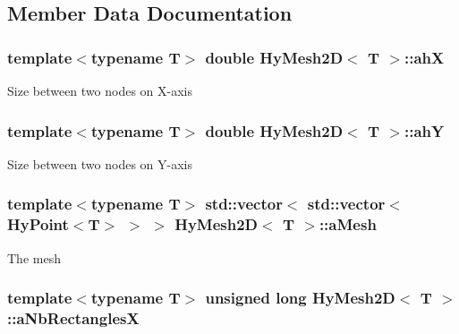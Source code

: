 \subsection{Member Data Documentation}
\hypertarget{classHyMesh2D_a613e4597dc45ca5629ec46eb941e9db8}{
\subsubsection[{ahX}]{\setlength{\rightskip}{0pt plus 5cm}template$<$typename T$>$ double {\bf HyMesh2D}$<$ T $>$::{\bf ahX}}}
\label{classHyMesh2D_a613e4597dc45ca5629ec46eb941e9db8}
Size between two nodes on X-\/axis \hypertarget{classHyMesh2D_a90e7b6ebe92fca8ad22795899ec8500b}{
\subsubsection[{ahY}]{\setlength{\rightskip}{0pt plus 5cm}template$<$typename T$>$ double {\bf HyMesh2D}$<$ T $>$::{\bf ahY}}}
\label{classHyMesh2D_a90e7b6ebe92fca8ad22795899ec8500b}
Size between two nodes on Y-\/axis \hypertarget{classHyMesh2D_af82a94a4943d2da5637d0bbc0b405eed}{
\subsubsection[{aMesh}]{\setlength{\rightskip}{0pt plus 5cm}template$<$typename T$>$ std::vector$<$ std::vector$<${\bf HyPoint}$<$T$>$ $>$ $>$ {\bf HyMesh2D}$<$ T $>$::{\bf aMesh}}}
\label{classHyMesh2D_af82a94a4943d2da5637d0bbc0b405eed}
The mesh \hypertarget{classHyMesh2D_a53430a7d9168ad8e9392252b87e139eb}{
\subsubsection[{aNbRectanglesX}]{\setlength{\rightskip}{0pt plus 5cm}template$<$typename T$>$ unsigned long {\bf HyMesh2D}$<$ T $>$::{\bf aNbRectanglesX}}}
